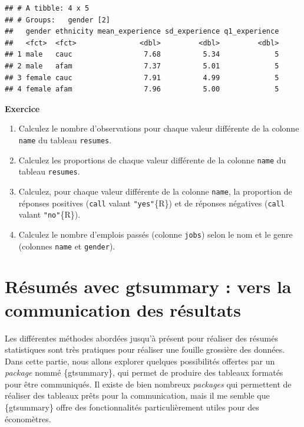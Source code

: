 \documentclass[
  11pt,
]{book}
\providecommand{\tightlist}{%
  \setlength{\itemsep}{0pt}\setlength{\parskip}{0pt}}
\numberwithin{equation}{section}
\numberwithin{countremarque}{section}
\newenvironment{greenbox}{
  \begin{tcolorbox}[breakable, colback=vert,coltext=black,
                  colframe=grisfonce]}
 {\end{tcolorbox}}
\begin{document}
\begin{lstlisting}
## # A tibble: 4 x 5
## # Groups:   gender [2]
##   gender ethnicity mean_experience sd_experience q1_experience
##   <fct>  <fct>               <dbl>         <dbl>         <dbl>
## 1 male   cauc                 7.68          5.34             5
## 2 male   afam                 7.37          5.01             5
## 3 female cauc                 7.91          4.99             5
## 4 female afam                 7.96          5.00             5
\end{lstlisting}

\begin{greenbox}

\textbf{Exercice}

\begin{enumerate}
\def\labelenumi{\arabic{enumi}.}
\tightlist
\item
  Calculez le nombre d'observations pour chaque valeur différente de la colonne \texttt{name} du tableau \texttt{resumes}.
\item
  Calculez les proportions de chaque valeur différente de la colonne \texttt{name} du tableau \texttt{resumes}.
\item
  Calculez, pour chaque valeur différente de la colonne \texttt{name}, la proportion de réponses positives (\texttt{call} valant \texttt{"yes"}\{R\}) et de réponses négatives (\texttt{call} valant \texttt{"no"}\{R\}).
\item
  Calculez le nombre d'emplois passés (colonne \texttt{jobs}) selon le nom et le genre (colonnes \texttt{name} et \texttt{gender}).
\end{enumerate}

\end{greenbox}

\hypertarget{ruxe9sumuxe9s-avec-gtsummary-vers-la-communication-des-ruxe9sultats}{%
\section{Résumés avec gtsummary : vers la communication des résultats}\label{ruxe9sumuxe9s-avec-gtsummary-vers-la-communication-des-ruxe9sultats}}

Les différentes méthodes abordées jusqu'à présent pour réaliser des résumés statistiques sont très pratiques pour réaliser une fouille grossière des données. Dans cette partie, nous allons explorer quelques possibilités offertes par un \emph{package} nommé \{gtsummary\}, qui permet de produire des tableaux formatés pour être communiqués. Il existe de bien nombreux \emph{packages} qui permettent de réaliser des tableaux prêts pour la communication, mais il me semble que \{gtsummary\} offre des fonctionnalités particulièrement utiles pour des économètres.
\end{document}
